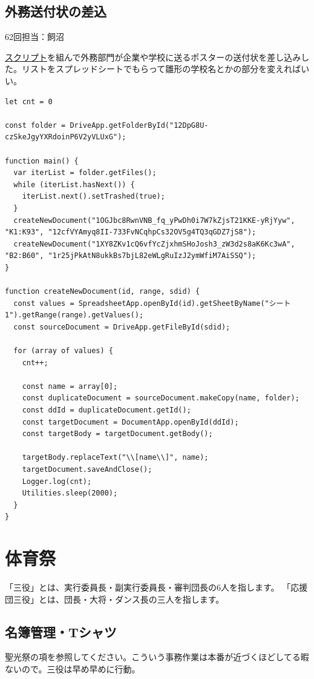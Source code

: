 \documentclass[a4paper]{ltjsreport}
\newcommand{\Chapter}[1]{\chapter{#1}\thispagestyle{fancy}}
\begin{document}
\section{外務送付状の差込}\label{sec:外務送付状の差込}
62回担当：飼沼

\href{https://script.google.com/d/1peO_Bmf9jcnJWGCZMN2IRhBrCqokkgPmUVuC4BlryH9kxAiHoXzkjO_x/edit?usp=sharing}{スクリプト}を組んで外務部門が企業や学校に送るポスターの送付状を差し込みした。リストをスプレッドシートでもらって雛形の学校名とかの部分を変えればいい。
\lstset{language=JavaScript}
\begin{lstlisting}
let cnt = 0

const folder = DriveApp.getFolderById("12DpG8U-czSkeJgyYXRdoinP6V2yVLUxG");

function main() {
  var iterList = folder.getFiles();
  while (iterList.hasNext()) {
    iterList.next().setTrashed(true);
  }
  createNewDocument("1OGJbc8RwnVNB_fq_yPwDh0i7W7kZjsT21KKE-yRjYyw", "K1:K93", "12cfVYAmyq8II-733FvNCqhpCs32OV5g4TQ3qGDZ7jS8");
  createNewDocument("1XY8ZKv1cQ6vfYcZjxhmSHoJosh3_zW3d2s8aK6Kc3wA", "B2:B60", "1r25jPkAtN8ukkBs7bjL82eWLgRuIzJ2ymWfiM7AiSSQ");
}

function createNewDocument(id, range, sdid) {
  const values = SpreadsheetApp.openById(id).getSheetByName("シート1").getRange(range).getValues();
  const sourceDocument = DriveApp.getFileById(sdid);

  for (array of values) {
    cnt++;

    const name = array[0];
    const duplicateDocument = sourceDocument.makeCopy(name, folder);
    const ddId = duplicateDocument.getId();
    const targetDocument = DocumentApp.openById(ddId);
    const targetBody = targetDocument.getBody();

    targetBody.replaceText("\\[name\\]", name);
    targetDocument.saveAndClose();
    Logger.log(cnt);
    Utilities.sleep(2000);
  }
}
\end{lstlisting}

\Chapter{体育祭}
「三役」とは、実行委員長・副実行委員長・審判団長の6人を指します。
「応援団三役」とは、団長・大将・ダンス長の三人を指します。

\section{名簿管理・Tシャツ}
聖光祭の項を参照してください。こういう事務作業は本番が近づくほどしてる暇ないので。三役は早め早めに行動。
\end{document}
